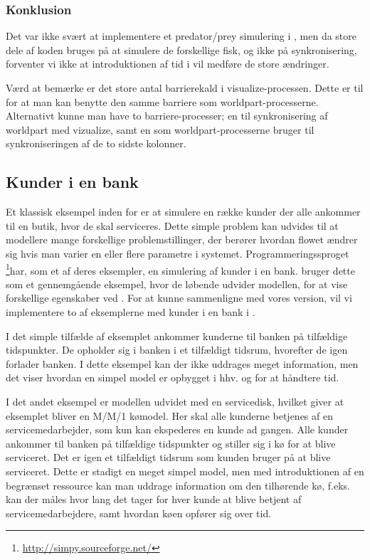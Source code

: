 \subsubsection{Konklusion}
Det var ikke svært at implementere et predator/prey simulering i \pycsp, men da store dele af koden bruges på at simulere  de forskellige fisk, og ikke på synkronisering, forventer vi ikke at introduktionen af tid i \pycsp vil medføre de store ændringer. 

Værd at bemærke er det store antal barrierekald i 
visualize-processen. Dette er til for at man kan benytte den samme barriere som 
worldpart-processerne. Alternativt kunne man have to barriere-processer; en til 
synkronisering af worldpart med vizualize, samt en som 
worldpart-processerne bruger til synkroniseringen af de to sidste kolonner. 

\subsection{Kunder i en bank}\label{bank-eksempel}
Et klassisk eksempel inden for \des er at simulere  en række kunder der alle 
ankommer til en butik, hvor de skal serviceres. Dette simple problem kan 
udvides til at modellere mange forskellige problemstillinger, der berører 
hvordan flowet ændrer sig hvis man varier en eller flere parametre
i systemet. Programmeringssproget \simpy\footnote{\url{http://simpy.sourceforge.net/}}har, som et af deres 
eksempler, en simulering af kunder i en bank. \simpy bruger dette som et 
gennemgående eksempel, hvor de løbende udvider modellen, for at vise 
forskellige egenskaber ved \simpy. For at kunne sammenligne \simpy  med vores 
version, vil vi implementere to af eksemplerne med kunder 
i en bank i \pycsp.

I det simple tilfælde af eksemplet ankommer kunderne til banken på 
tilfældige tidspunkter.  De opholder sig i banken i et tilfældigt 
tidsrum, hvorefter de igen forlader banken. I dette eksempel kan der ikke 
uddrages meget information, men det viser hvordan en simpel model er opbygget i 
hhv.  \simpy og \pycsp for at håndtere tid.

I det andet eksempel er modellen udvidet med en servicedisk, hvilket giver at eksemplet bliver en M/M/1 kømodel. Her skal alle 
kunderne betjenes af en servicemedarbejder, som kun kan ekspederes en kunde ad 
gangen. Alle kunder ankommer til banken på tilfældige tidspunkter  og stiller sig i 
kø for at blive serviceret. Det er igen et tilfældigt tidsrum som kunden bruger på at blive 
serviceret.  Dette er stadigt en meget simpel model, men med introduktionen af 
en begrænset ressource kan man uddrage information om den tilhørende kø, f.eks. 
kan der måles hvor lang det tager for hver kunde at blive betjent af 
servicemedarbejdere, samt hvordan køen opfører sig over tid. 

